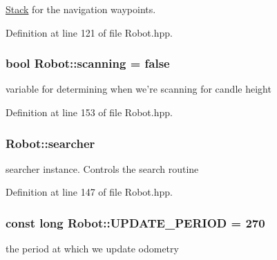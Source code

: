 \hyperlink{classStack}{Stack} for the navigation waypoints. 



Definition at line 121 of file Robot.\-hpp.

\hypertarget{classRobot_adcfb83201cfb8c8a7588d83aae0fc5be}{
\subsubsection[{scanning}]{\setlength{\rightskip}{0pt plus 5cm}bool Robot\-::scanning = false\hspace{0.3cm}{\ttfamily [private]}}}\label{classRobot_adcfb83201cfb8c8a7588d83aae0fc5be}


variable for determining when we're scanning for candle height 



Definition at line 153 of file Robot.\-hpp.

\hypertarget{classRobot_af0ba30c47b84dc976f5bb7bd978f95ef}{
\subsubsection[{searcher}]{ Robot\-::searcher\hspace{0.3cm}{\ttfamily [private]}}}\label{classRobot_af0ba30c47b84dc976f5bb7bd978f95ef}


searcher instance. Controls the search routine 



Definition at line 147 of file Robot.\-hpp.

\hypertarget{classRobot_a6a76c7da686c2cec0cba2877e0c914dc}{
\subsubsection[{U\-P\-D\-A\-T\-E\-\_\-\-P\-E\-R\-I\-O\-D}]{\setlength{\rightskip}{0pt plus 5cm}const long Robot\-::\-U\-P\-D\-A\-T\-E\-\_\-\-P\-E\-R\-I\-O\-D = 270\hspace{0.3cm}{\ttfamily [static]}}}\label{classRobot_a6a76c7da686c2cec0cba2877e0c914dc}


the period at which we update odometry 



